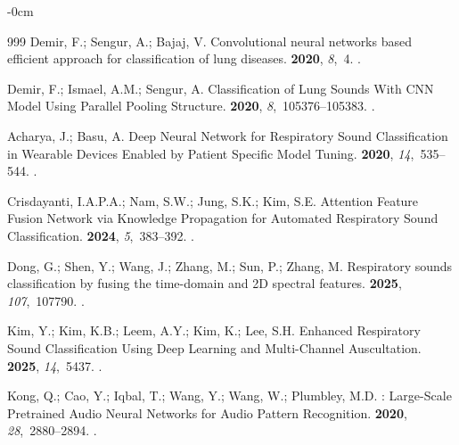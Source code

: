 \documentclass[algorithms,article,submit,pdftex,oneauthor]{Definitions/mdpi}
\begin{document}
\begin{adjustwidth}{-\extralength}{0cm}
\begin{thebibliography}{999}
Demir, F.; Sengur, A.; Bajaj, V.
\newblock Convolutional neural networks based efficient approach for
  classification of lung diseases.
 {\bf 2020}, {\em 8},~4.
.

Demir, F.; Ismael, A.M.; Sengur, A.
\newblock Classification of Lung Sounds With {CNN} Model Using Parallel Pooling
  Structure.
 {\bf 2020}, {\em 8},~105376--105383.
.

Acharya, J.; Basu, A.
\newblock Deep Neural Network for Respiratory Sound Classification in Wearable
  Devices Enabled by Patient Specific Model Tuning.
 {\bf
  2020}, {\em 14},~535--544.
.

Crisdayanti, I.A.P.A.; Nam, S.W.; Jung, S.K.; Kim, S.E.
\newblock Attention Feature Fusion Network via Knowledge Propagation for
  Automated Respiratory Sound Classification.
 {\bf
  2024}, {\em 5},~383--392.
.

Dong, G.; Shen, Y.; Wang, J.; Zhang, M.; Sun, P.; Zhang, M.
\newblock Respiratory sounds classification by fusing the time-domain and {2D}
  spectral features.
 {\bf 2025}, {\em
  107},~107790.
.

Kim, Y.; Kim, K.B.; Leem, A.Y.; Kim, K.; Lee, S.H.
\newblock Enhanced Respiratory Sound Classification Using Deep Learning and
  Multi-Channel Auscultation.
 {\bf 2025}, {\em 14},~5437.
.

Kong, Q.; Cao, Y.; Iqbal, T.; Wang, Y.; Wang, W.; Plumbley, M.D.
: Large-Scale Pretrained Audio Neural Networks for Audio
  Pattern Recognition.
  {\bf 2020}, {\em 28},~2880--2894.
.


\end{thebibliography}
\end{adjustwidth}
\end{document}
